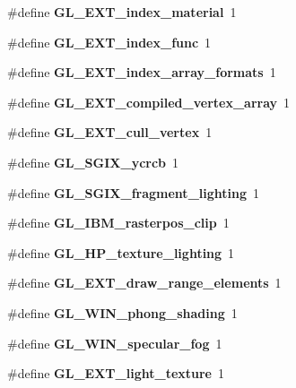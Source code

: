 \begin{DoxyCompactItemize}
\item 
\#define {\bfseries G\+L\+\_\+\+E\+X\+T\+\_\+index\+\_\+material}~1\label{_s_d_l__opengl_8h_af3b2109964d57c83f135c58a206f2644}

\item 
\#define {\bfseries G\+L\+\_\+\+E\+X\+T\+\_\+index\+\_\+func}~1\label{_s_d_l__opengl_8h_a012c21f1da736a072754b54a387c224d}

\item 
\#define {\bfseries G\+L\+\_\+\+E\+X\+T\+\_\+index\+\_\+array\+\_\+formats}~1\label{_s_d_l__opengl_8h_aa40ceda988bbf83ecaa34c6359505bf5}

\item 
\#define {\bfseries G\+L\+\_\+\+E\+X\+T\+\_\+compiled\+\_\+vertex\+\_\+array}~1\label{_s_d_l__opengl_8h_a6c62c07e0bf28da1b5de72029b4bff20}

\item 
\#define {\bfseries G\+L\+\_\+\+E\+X\+T\+\_\+cull\+\_\+vertex}~1\label{_s_d_l__opengl_8h_a4f1335a4f692feea8bd9b0af3ff3ffcd}

\item 
\#define {\bfseries G\+L\+\_\+\+S\+G\+I\+X\+\_\+ycrcb}~1\label{_s_d_l__opengl_8h_aefd598cf07cc51cc8c5cacfa5d979e8f}

\item 
\#define {\bfseries G\+L\+\_\+\+S\+G\+I\+X\+\_\+fragment\+\_\+lighting}~1\label{_s_d_l__opengl_8h_a2c727ca12944f964ea445893187bd6ec}

\item 
\#define {\bfseries G\+L\+\_\+\+I\+B\+M\+\_\+rasterpos\+\_\+clip}~1\label{_s_d_l__opengl_8h_a3cd70bac291cb3a155bff2a4b27ecd1f}

\item 
\#define {\bfseries G\+L\+\_\+\+H\+P\+\_\+texture\+\_\+lighting}~1\label{_s_d_l__opengl_8h_aaec6561e8c0a363b93350b6a140462c7}

\item 
\#define {\bfseries G\+L\+\_\+\+E\+X\+T\+\_\+draw\+\_\+range\+\_\+elements}~1\label{_s_d_l__opengl_8h_a09cb31ca41911d25f0a7726736e4501f}

\item 
\#define {\bfseries G\+L\+\_\+\+W\+I\+N\+\_\+phong\+\_\+shading}~1\label{_s_d_l__opengl_8h_a065f2015180040ab6e728fb8050543f8}

\item 
\#define {\bfseries G\+L\+\_\+\+W\+I\+N\+\_\+specular\+\_\+fog}~1\label{_s_d_l__opengl_8h_a0875cc3370a5f02d9078b6a8061fc34e}

\item 
\#define {\bfseries G\+L\+\_\+\+E\+X\+T\+\_\+light\+\_\+texture}~1\label{_s_d_l__opengl_8h_a8e266c9ccc06e601b0ebb6c2d1435467}


\end{DoxyCompactItemize}
